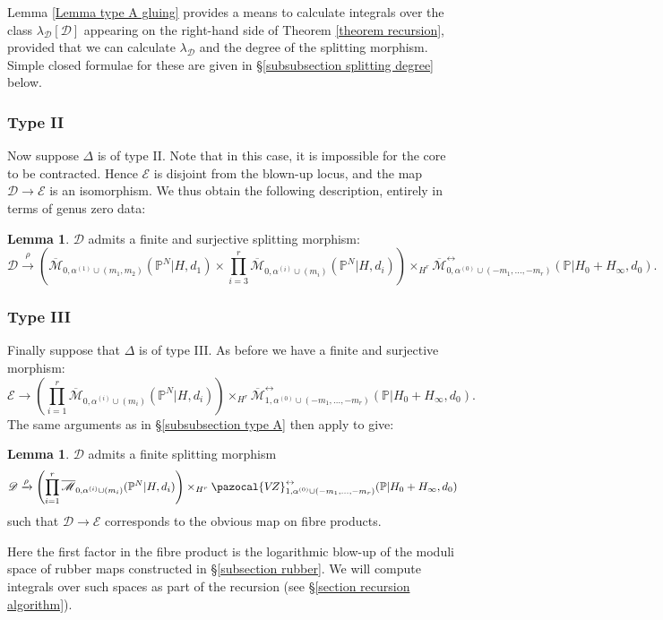 \documentclass[11pt]{amsart}
\newcommand{\PP}{\mathbb P}
\newcommand{\VZ}{\pazocal{V\!Z}}
\renewcommand{\to}{\rightarrow}
\newcommand{\Mcal}{\mathcal{M}}
\newcommand{\Dcal}{\mathcal{D}}
\newcommand{\Ecal}{\mathcal{E}}
\newcommand{\ol}[1]{\overline{#1}}
\theoremstyle{definition}
\newtheorem{lemma}[thm]{Lemma}
\theoremstyle{definition}
\begin{document}
Lemma \ref{Lemma type A gluing} provides a means to calculate integrals over the class $\lambda_\Dcal[\Dcal]$ appearing on the right-hand side of Theorem \ref{theorem recursion}, provided that we can calculate $\lambda_\Dcal$ and the degree of the splitting morphism. Simple closed formulae for these are given in \S \ref{subsubsection splitting degree} below.

\subsubsection{Type II}
Now suppose $\Delta$ is of type II. Note that in this case, it is impossible for the core to be contracted. Hence $\Ecal$ is disjoint from the blown-up locus, and the map $\Dcal \to \Ecal$ is an isomorphism. We thus obtain the following description, entirely in terms of genus zero data:
\begin{lemma} $\Dcal$ admits a finite and surjective splitting morphism:
\begin{equation*} \Dcal \xrightarrow{\rho} \left(\ol\Mcal_{0,\alpha^{(1)}\cup(m_1,m_2)}(\PP^N|H,d_1)\times\prod_{i=3}^r \ol\Mcal_{0,\alpha^{(i)}\cup(m_i)}(\PP^N|H,d_i)\right) \times_{H^r} \ol\Mcal^{\leftrightarrow}_{0,\alpha^{(0)}\cup(-m_1,\ldots,-m_r)}(\mathbb P|H_0+H_\infty,d_0).\end{equation*}\end{lemma}

\subsubsection{Type III} \label{subsubsection type C+} Finally suppose that $\Delta$ is of type III. As before we have a finite and surjective morphism:
\begin{equation*} \Ecal \to  \left( \prod_{i=1}^r \ol\Mcal_{0,\alpha^{(i)}\cup(m_i)}(\PP^N|H,d_i) \right) \times_{H^r} \ol\Mcal^{\leftrightarrow}_{1,\alpha^{(0)}\cup(-m_1,\ldots,-m_r)}(\mathbb{P}|H_0+H_\infty,d_0). \end{equation*}
The same arguments as in \S \ref{subsubsection type A} then apply to give:
\begin{lemma} $\Dcal$ admits a finite splitting morphism
\begin{equation*}\Dcal \xrightarrow{\rho} \left( \prod_{i=1}^r \ol\Mcal_{0,\alpha^{(i)}\cup(m_i)}(\PP^N|H,d_i) \right) \times_{H^r} \VZ^{\leftrightarrow}_{1,\alpha^{(0)}\cup(-m_1,\ldots,-m_r)}(\mathbb{P}|H_0+H_\infty,d_0)\end{equation*}
such that $\Dcal \to \Ecal$ corresponds to the obvious map on fibre products.\end{lemma}
Here the first factor in the fibre product is the logarithmic blow-up of the moduli space of rubber maps constructed in \S \ref{subsection rubber}. We will compute integrals over such spaces as part of the recursion (see \S \ref{section recursion algorithm}).
\end{document}

